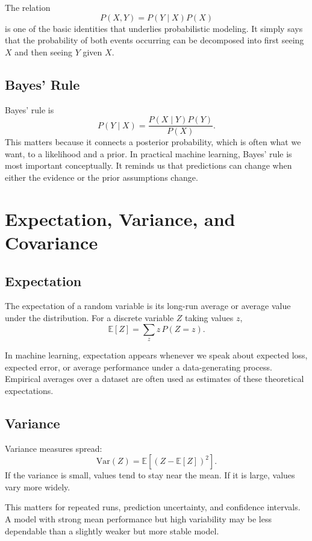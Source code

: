 The relation
\[
P(X,Y) = P(Y \mid X)P(X)
\]
is one of the basic identities that underlies probabilistic modeling. It simply says that the probability of both events occurring can be decomposed into first seeing $X$ and then seeing $Y$ given $X$.

\subsection{Bayes' Rule}

Bayes' rule is
\[
P(Y \mid X) = \frac{P(X \mid Y)P(Y)}{P(X)}.
\]
This matters because it connects a posterior probability, which is often what we want, to a likelihood and a prior. In practical machine learning, Bayes' rule is most important conceptually. It reminds us that predictions can change when either the evidence or the prior assumptions change.

\section{Expectation, Variance, and Covariance}

\subsection{Expectation}

The expectation of a random variable is its long-run average or average value under the distribution. For a discrete variable $Z$ taking values $z$,
\[
\mathbb{E}[Z] = \sum_z z \, P(Z=z).
\]

In machine learning, expectation appears whenever we speak about expected loss, expected error, or average performance under a data-generating process. Empirical averages over a dataset are often used as estimates of these theoretical expectations.

\subsection{Variance}

Variance measures spread:
\[
\mathrm{Var}(Z) = \mathbb{E}\left[(Z - \mathbb{E}[Z])^2\right].
\]
If the variance is small, values tend to stay near the mean. If it is large, values vary more widely.

This matters for repeated runs, prediction uncertainty, and confidence intervals. A model with strong mean performance but high variability may be less dependable than a slightly weaker but more stable model.

